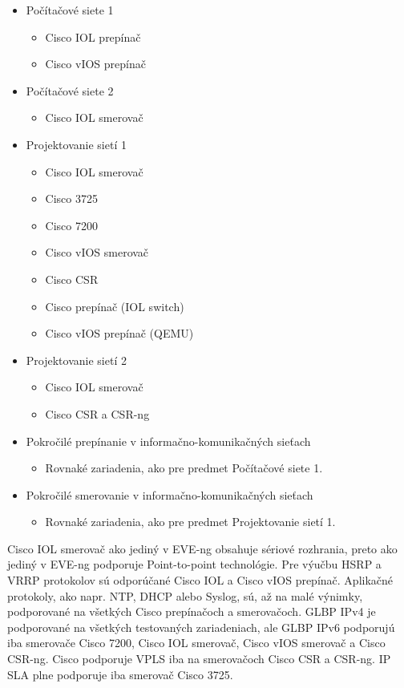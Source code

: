 \begin{itemize}[noitemsep]
    \item Počítačové siete 1
    \begin{itemize}[noitemsep]
        \item Cisco IOL prepínač
        \item Cisco vIOS prepínač
    \end{itemize}
    \item Počítačové siete 2
    \begin{itemize}[noitemsep]
        \item Cisco IOL smerovač
    \end{itemize}
    \item Projektovanie sietí 1
    \begin{itemize}[noitemsep]
        \item Cisco IOL smerovač
        \item Cisco 3725
        \item Cisco 7200
        \item Cisco vIOS smerovač
        \item Cisco CSR
        \item Cisco prepínač (IOL switch)
        \item Cisco vIOS prepínač (QEMU)
    \end{itemize}
    \item Projektovanie sietí 2
    \begin{itemize}[noitemsep]
        \item Cisco IOL smerovač
        \item Cisco CSR a CSR-ng
    \end{itemize}
    \item Pokročilé prepínanie v informačno-komunikačných sieťach
    \begin{itemize}[noitemsep]
        \item Rovnaké zariadenia, ako pre predmet Počítačové siete 1.
    \end{itemize}
    \item Pokročilé smerovanie v informačno-komunikačných sieťach
    \begin{itemize}[noitemsep]
        \item Rovnaké zariadenia, ako pre predmet Projektovanie sietí 1.
    \end{itemize}
\end{itemize}

Cisco IOL smerovač ako jediný v EVE-ng obsahuje sériové rozhrania, preto ako jediný v EVE-ng podporuje Point-to-point technológie. Pre výučbu HSRP a VRRP protokolov sú odporúčané Cisco IOL a Cisco vIOS prepínač. Aplikačné protokoly, ako napr. NTP, DHCP alebo Syslog, sú, až na malé výnimky, podporované na všetkých Cisco prepínačoch a smerovačoch. GLBP IPv4 je podporované na všetkých testovaných zariadeniach, ale GLBP IPv6 podporujú iba smerovače Cisco 7200, Cisco IOL smerovač, Cisco vIOS smerovač a Cisco CSR-ng. Cisco podporuje VPLS iba na smerovačoch Cisco CSR a CSR-ng. IP SLA plne podporuje iba smerovač Cisco 3725.

